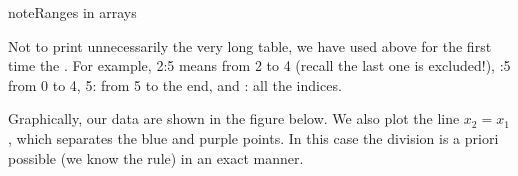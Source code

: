 \documentclass[a4paper,12pt,polish]{jupyterBook}
\begin{document}
\begin{sphinxadmonition}{note}{Ranges in arrays}

\sphinxAtStartPar
Not to print unnecessarily the very long table, we have used above for the first time the . For example, 2:5 means from 2 to 4 (recall the last one is excluded!), :5  \sphinxhyphen{} from 0 to 4, 5: \sphinxhyphen{} from 5 to the end, and : \sphinxhyphen{} all the indices.
\end{sphinxadmonition}

\sphinxAtStartPar
Graphically, our data are shown in the figure below. We also plot the line \(x_2=x_1\), which separates the blue and purple points. In this case the division is a priori possible (we know the rule) in an exact manner.
\begin{sphinxVerbatimInput}

\begin{sphinxVerbatim}[commandchars=\\\{\}]
                                  
\PYG{p}{[}\PYG{p}{]}\PYG{p}{[}\PYG{p}{]}\PYG{p}{[}\PYG{p}{]}       
                              

\PYG{p}{[} \PYG{p}{]} \PYG{p}{[} \PYG{p}{]}                 


\end{sphinxVerbatim}
\end{sphinxVerbatimInput}
\end{document}
